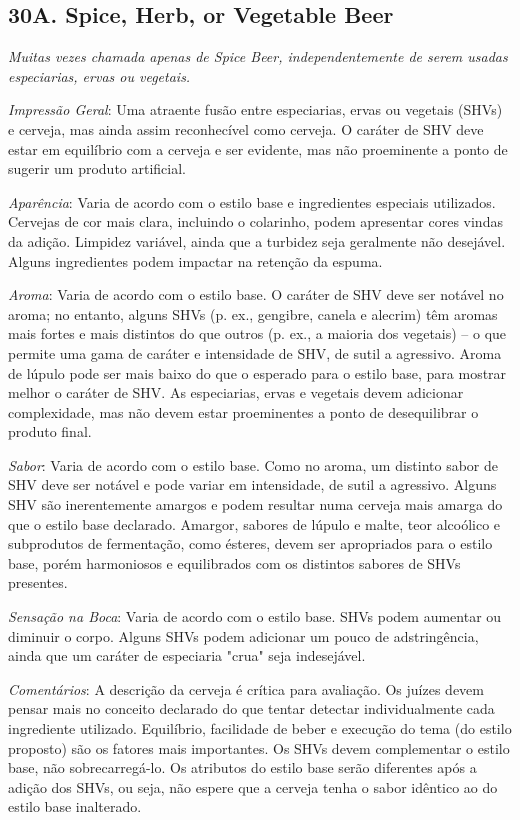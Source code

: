 \subsection*{30A. Spice, Herb, or Vegetable Beer}
\textit{Muitas vezes chamada apenas de Spice Beer, independentemente de serem usadas especiarias, ervas ou vegetais.}

\textit{Impressão Geral}: Uma atraente fusão entre especiarias, ervas ou vegetais (SHVs) e cerveja, mas ainda assim reconhecível como cerveja. O caráter de SHV deve estar em equilíbrio com a cerveja e ser evidente, mas não proeminente a ponto de sugerir um produto artificial.

\textit{Aparência}: Varia de acordo com o estilo base e ingredientes especiais utilizados. Cervejas de cor mais clara, incluindo o colarinho, podem apresentar cores vindas da adição. Limpidez variável, ainda que a turbidez seja geralmente não desejável. Alguns ingredientes podem impactar na retenção da espuma.

\textit{Aroma}: Varia de acordo com o estilo base. O caráter de SHV deve ser notável no aroma; no entanto, alguns SHVs (p. ex., gengibre, canela e alecrim) têm aromas mais fortes e mais distintos do que outros (p. ex., a maioria dos vegetais) – o que permite uma gama de caráter e intensidade de SHV, de sutil a agressivo. Aroma de lúpulo pode ser mais baixo do que o esperado para o estilo base, para mostrar melhor o caráter de SHV. As especiarias, ervas e vegetais devem adicionar complexidade, mas não devem estar proeminentes a ponto de desequilibrar o produto final.

\textit{Sabor}: Varia de acordo com o estilo base. Como no aroma, um distinto sabor de SHV deve ser notável e pode variar em intensidade, de sutil a agressivo. Alguns SHV são inerentemente amargos e podem resultar numa cerveja mais amarga do que o estilo base declarado. Amargor, sabores de lúpulo e malte, teor alcoólico e subprodutos de fermentação, como ésteres, devem ser apropriados para o estilo base, porém harmoniosos e equilibrados com os distintos sabores de SHVs presentes.

\textit{Sensação na Boca}: Varia de acordo com o estilo base. SHVs podem aumentar ou diminuir o corpo. Alguns SHVs podem adicionar um pouco de adstringência, ainda que um caráter de especiaria "crua" seja indesejável.

\textit{Comentários}: A descrição da cerveja é crítica para avaliação. Os juízes devem pensar mais no conceito declarado do que tentar detectar individualmente cada ingrediente utilizado. Equilíbrio, facilidade de beber e execução do tema (do estilo proposto) são os fatores mais importantes. Os SHVs devem complementar o estilo base, não sobrecarregá-lo. Os atributos do estilo base serão diferentes após a adição dos SHVs, ou seja, não espere que a cerveja tenha o sabor idêntico ao do estilo base inalterado.

